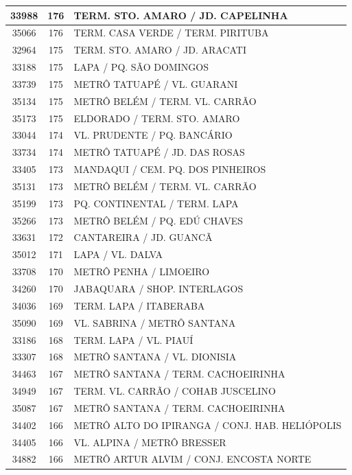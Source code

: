 \documentclass[
	12pt,				%
	oneside,			%
	a4paper,			%
	english,			%
	brazil				%
	]{abntex2ppgsi}
\begin{document}
{{{\begin{apendicesenv}
\begin{longtable}{c|c|p{7cm}}
33988 &	176 &	TERM. STO. AMARO / JD. CAPELINHA \\ 
 \hline 
35066 &	176 &	TERM. CASA VERDE / TERM. PIRITUBA \\ 
 \hline 
32964 &	175 &	TERM. STO. AMARO / JD. ARACATI \\ 
 \hline 
33188 &	175 &	LAPA / PQ. SÃO DOMINGOS \\ 
 \hline 
33739 &	175 &	METRÔ TATUAPÉ / VL. GUARANI \\ 
 \hline 
35134 &	175 &	METRÔ BELÉM / TERM. VL. CARRÃO \\ 
 \hline 
35173 &	175 &	ELDORADO / TERM. STO. AMARO \\ 
 \hline 
33044 &	174 &	VL. PRUDENTE / PQ. BANCÁRIO \\ 
 \hline 
33734 &	174 &	METRÔ TATUAPÉ / JD. DAS ROSAS \\ 
 \hline 
33405 &	173 &	MANDAQUI / CEM. PQ. DOS PINHEIROS \\ 
 \hline 
35131 &	173 &	METRÔ BELÉM / TERM. VL. CARRÃO \\ 
 \hline 
35199 &	173 &	PQ. CONTINENTAL / TERM. LAPA \\ 
 \hline 
35266 &	173 &	METRÔ BELÉM / PQ. EDÚ CHAVES \\ 
 \hline 
33631 &	172 &	CANTAREIRA / JD. GUANCÃ \\ 
 \hline 
35012 &	171 &	LAPA / VL. DALVA \\ 
 \hline 
33708 &	170 &	METRÔ PENHA / LIMOEIRO \\ 
 \hline 
34260 &	170 &	JABAQUARA / SHOP. INTERLAGOS \\ 
 \hline 
34036 &	169 &	TERM. LAPA / ITABERABA \\ 
 \hline 
35090 &	169 &	VL. SABRINA / METRÔ SANTANA \\ 
 \hline 
33186 &	168 &	TERM. LAPA / VL. PIAUÍ \\ 
 \hline 
33307 &	168 &	METRÔ SANTANA / VL. DIONISIA \\ 
 \hline 
34463 &	167 &	METRÔ SANTANA / TERM. CACHOEIRINHA \\ 
 \hline 
34949 &	167 &	TERM. VL. CARRÃO / COHAB JUSCELINO \\ 
 \hline 
35087 &	167 &	METRÔ SANTANA / TERM. CACHOEIRINHA \\ 
 \hline 
34402 &	166 &	METRÔ ALTO DO IPIRANGA / CONJ. HAB. HELIÓPOLIS \\ 
 \hline 
34405 &	166 &	VL. ALPINA / METRÔ BRESSER \\ 
 \hline 
34882 &	166 &	METRÔ ARTUR ALVIM / CONJ. ENCOSTA NORTE \\ 

\end{longtable}
\end{apendicesenv}}}}
\end{document}
